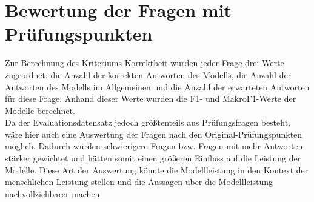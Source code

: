 \section{Bewertung der Fragen mit Prüfungspunkten}
Zur Berechnung des Kriteriums Korrektheit wurden jeder Frage drei Werte zugeordnet: die Anzahl der korrekten Antworten des Modells, die Anzahl der Antworten des Modells im Allgemeinen und die Anzahl der erwarteten Antworten für diese Frage.
Anhand dieser Werte wurden die F1- und MakroF1-Werte der Modelle berechnet.\\

Da der Evaluationsdatensatz jedoch größtenteils aus Prüfungsfragen besteht, wäre hier auch eine Auswertung der Fragen nach den Original-Prüfungspunkten möglich.
Dadurch würden schwierigere Fragen bzw. Fragen mit mehr Antworten stärker gewichtet und hätten somit einen größeren Einfluss auf die Leistung der Modelle.
Diese Art der Auswertung könnte die Modellleistung in den Kontext der menschlichen Leistung stellen und die Aussagen über die Modellleistung nachvollziehbarer machen.
